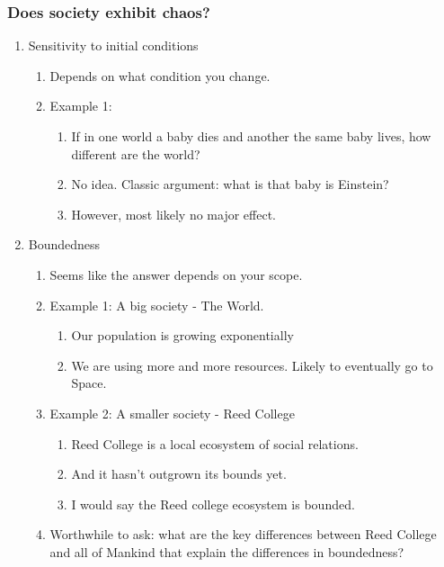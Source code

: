 \documentclass[11pt, handout]{beamer}
\begin{document}
\begin{frame}
    \frametitle{Does society exhibit chaos?}
    \begin{enumerate}
        \item Sensitivity to initial conditions
            \begin{enumerate}
                \item Depends on what condition you change.
                \item Example 1: 
                    \begin{enumerate}
                        \item If in one world a baby dies and another the same baby lives, how different are the world?
                        \item No idea. Classic argument: what is that baby is Einstein?
                        \item However, most likely no major effect.
                    \end{enumerate}
            \end{enumerate}
        \item Boundedness
            \begin{enumerate}
                \item Seems like the answer depends on your scope.
                \item Example 1: A big society - The World.
                    \begin{enumerate}
                        \item Our population is growing exponentially
                        \item We are using more and more resources. Likely to eventually go to Space.
                    \end{enumerate}
                \item Example 2: A smaller society - Reed College
                    \begin{enumerate}
                        \item Reed College is a local ecosystem of social relations.
                        \item And it hasn't outgrown its bounds yet. 
                        \item I would say the Reed college ecosystem is bounded.
                    \end{enumerate}
                \item Worthwhile to ask: what are the key differences between Reed College and all of Mankind that explain the differences in boundedness?

\end{enumerate}
\end{enumerate}
\end{frame}
\end{document}
